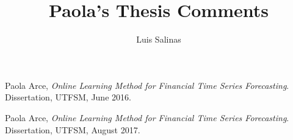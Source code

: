 \documentclass[10pt,reqno]{amsart}
\title[Paola's Thesis Comments]{Paola's Thesis Comments}
\author[L. Salinas]{Luis Salinas}
\def\blue#1{{\color{blue} #1}}
\def\red#1{{\color{red} #1}}
\begin{document}
\maketitle%

\def\myitem#1{ \item[\blue{\bf #1}] }





\newpage



\begin{thebibliography}{99}
Paola Arce, 
{\em Online Learning Method for Financial Time Series Forecasting\/}.
Dissertation, UTFSM, \red{June 2016}.

Paola Arce, 
{\em Online Learning Method for Financial Time Series Forecasting\/}.
Dissertation, UTFSM, \red{August 2017}.

\end{thebibliography}
\end{document}
